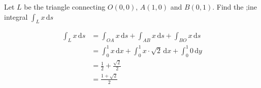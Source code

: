 
\begin{example}
    Let $L$ be the triangle connecting $O(0,0)$, $A(1,0)$ and $B(0,1)$. Find the ;ine integral $\int_L x\,\mathrm{d}s$

    \begin{align*}
        \int_L x\,\mathrm{d}s
         & =\int_{OA} x\,\mathrm{d}s+\int_{AB} x\,\mathrm{d}s+\int_{BO} x\,\mathrm{d}s           \\
         & =\int_0^1 x\,\mathrm{d}x+\int_0^1 x\cdot\sqrt{2}\,\mathrm{d}x+\int_0^1 0\,\mathrm{d}y \\
         & =\frac{1}{2}+\frac{\sqrt{2}}{2}                                                       \\
         & =\frac{1+\sqrt{2}}{2}
    \end{align*}
\end{example}

